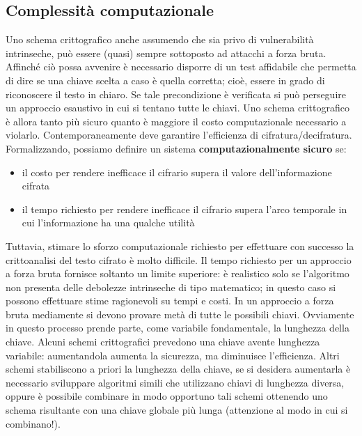 \subsection{Complessità computazionale} 
Uno schema crittografico anche assumendo che sia privo di vulnerabilità intrinseche, può essere (quasi) sempre sottoposto ad attacchi a forza bruta. Affinché ciò possa avvenire è necessario disporre di un test affidabile che permetta di dire se una chiave scelta a caso è quella corretta; cioè, essere in grado di riconoscere il testo in chiaro. Se tale precondizione è verificata si può perseguire un approccio esaustivo in cui si tentano tutte le chiavi. Uno schema crittografico è allora tanto più sicuro quanto è maggiore il costo computazionale necessario a violarlo. Contemporaneamente deve garantire l'efficienza di cifratura/decifratura. Formalizzando, possiamo definire un sistema \textbf{computazionalmente sicuro} se:
\begin{itemize} 
  \item il costo per rendere inefficace il cifrario supera il valore dell’informazione cifrata
  \item il tempo richiesto per rendere inefficace il cifrario supera l’arco temporale in cui l’informazione ha una qualche utilità
\end{itemize}
Tuttavia, stimare lo sforzo computazionale richiesto per effettuare con successo la crittoanalisi del testo cifrato è molto difficile. Il tempo richiesto per un approccio a forza bruta fornisce soltanto un limite superiore: è realistico solo se l’algoritmo non presenta delle debolezze intrinseche di tipo matematico; in questo caso si possono effettuare stime ragionevoli su tempi e costi. In un approccio a forza bruta mediamente si devono provare metà di tutte le possibili chiavi. Ovviamente in questo processo prende parte, come variabile fondamentale, la lunghezza della chiave. Alcuni schemi crittografici prevedono una chiave avente lunghezza variabile: aumentandola aumenta la sicurezza, ma diminuisce l'efficienza. Altri schemi stabiliscono a priori la lunghezza della chiave, se si desidera aumentarla è necessario sviluppare algoritmi simili che utilizzano chiavi di lunghezza diversa, oppure è possibile combinare in modo opportuno tali schemi ottenendo uno schema risultante con una chiave globale più lunga (attenzione al modo in cui si combinano!).

